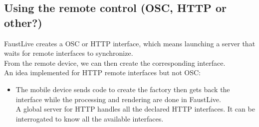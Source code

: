 \documentclass[a4paper]{article}
\begin{document}
\newpage
\subsection{ Using the remote control (OSC, HTTP or other?)} \label{remotecontrol}
FaustLive creates a OSC or HTTP interface, which means launching a server that waits for remote interfaces to synchronize. \\
From the remote device, we can then create the corresponding interface.\\

An idea implemented for HTTP remote interfaces but not OSC:
\begin{itemize}
\item The mobile device sends code to create the factory then gets back the interface while the processing and rendering are done in FaustLive. \\
A global server for HTTP handles all the declared HTTP interfaces. It can be interrogated to know all the available interfaces.
\end{itemize}
\end{document}
